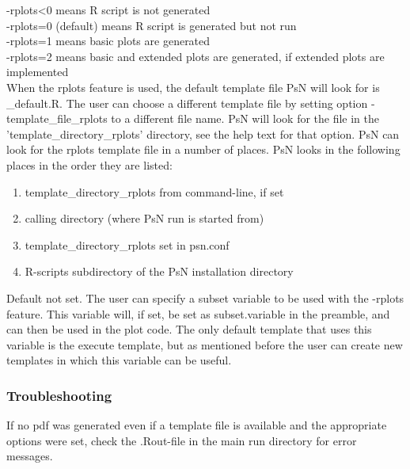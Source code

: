 \begin{optionlist}
-rplots<0 means R script is not generated\\ 
-rplots=0 (default) means R script is generated but not run\\ 
-rplots=1 means basic plots are generated\\													  
-rplots=2 means basic and extended plots are generated, if extended plots are implemented\\													  
\nextopt
{}
When the rplots feature is used, the default template file PsN will look for is 
\guidetoolname\_default.R. 
The user can choose a different template file
by setting option -template\_file\_rplots to a different file name. 
PsN will look for the file in the 'template\_directory\_rplots' directory, see the help text 
for that option.
\nextopt
{}
PsN can look for the rplots template file in a number of places. 
PsN looks in the following places in the order they are listed:
\begin{enumerate}
\item template\_directory\_rplots from command-line, if set 
\item calling directory (where PsN run is started from)
\item template\_directory\_rplots set in psn.conf 
\item R-scripts subdirectory of the PsN installation directory
\end{enumerate}
\nextopt
{}
Default not set. The user can specify a subset variable to be used with the -rplots feature. 
This variable
will, if set, be set as subset.variable in the preamble,
and can then be used in the plot code.  
The only default template that uses this variable is the execute template,
but as mentioned before the user can create new templates in which this variable
can be useful.
\nextopt
\end{optionlist}

\subsubsection*{Troubleshooting}
If no pdf was generated even if a template file is available and the appropriate options
were set, check the .Rout-file in the main run directory for error messages.
